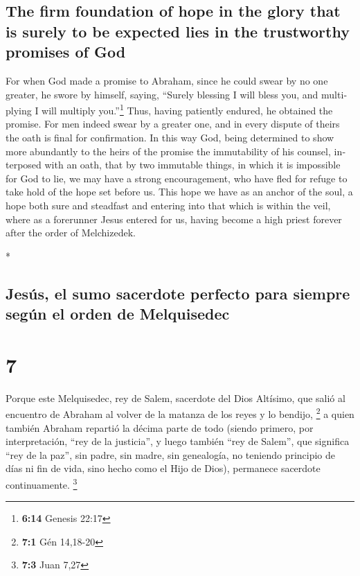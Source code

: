 \begin{paracol}{2}
\begin{otherlanguage}{english}
\hypertarget{the-firm-foundation-of-hope-in-the-glory-that-is-surely-to-be-expected-lies-in-the-trustworthy-promises-of-god}{%
\subsection{The firm foundation of hope in the glory that is surely to
be expected lies in the trustworthy promises of
God}\label{the-firm-foundation-of-hope-in-the-glory-that-is-surely-to-be-expected-lies-in-the-trustworthy-promises-of-god}}

 For when God made a promise to Abraham, since he could
swear by no one greater, he swore by himself,  saying,
``Surely blessing I will bless you, and multiplying I will multiply
you.''\footnote{\textbf{6:14} Genesis 22:17}  Thus,
having patiently endured, he obtained the promise.  For
men indeed swear by a greater one, and in every dispute of theirs the
oath is final for confirmation.  In this way God, being
determined to show more abundantly to the heirs of the promise the
immutability of his counsel, interposed with an oath, 
that by two immutable things, in which it is impossible for God to lie,
we may have a strong encouragement, who have fled for refuge to take
hold of the hope set before us.  This hope we have as an
anchor of the soul, a hope both sure and steadfast and entering into
that which is within the veil,  where as a forerunner
Jesus entered for us, having become a high priest forever after the
order of Melchizedek.

\end{otherlanguage}

\switchcolumn[0]*

\hypertarget{jesuxfas-el-sumo-sacerdote-perfecto-para-siempre-seguxfan-el-orden-de-melquisedec}{%
\subsection{Jesús, el sumo sacerdote perfecto para siempre según el
orden de
Melquisedec}\label{jesuxfas-el-sumo-sacerdote-perfecto-para-siempre-seguxfan-el-orden-de-melquisedec}}

\hypertarget{section-12}{%
\section{7}\label{section-12}}

 Porque este Melquisedec, rey de Salem, sacerdote del Dios
Altísimo, que salió al encuentro de Abraham al volver de la matanza de
los reyes y lo bendijo, \footnote{\textbf{7:1} Gén 14,18-20}
 a quien también Abraham repartió la décima parte de todo
(siendo primero, por interpretación, ``rey de la justicia'', y luego
también ``rey de Salem'', que significa ``rey de la paz'',
 sin padre, sin madre, sin genealogía, no teniendo
principio de días ni fin de vida, sino hecho como el Hijo de Dios),
permanece sacerdote continuamente. \footnote{\textbf{7:3} Juan 7,27}


\end{paracol}
